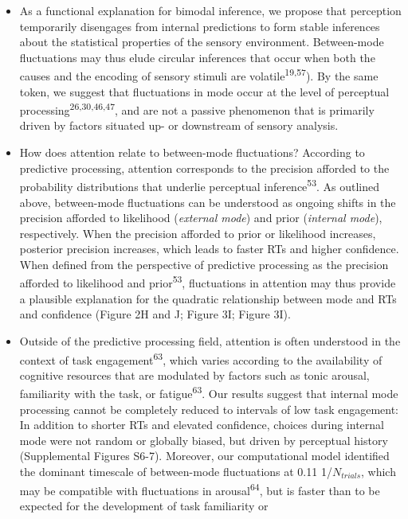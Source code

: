 \documentclass[
]{article}
\begin{document}
\begin{itemize}
\item
  As a functional explanation for bimodal inference, we propose that
  perception temporarily disengages from internal predictions to form
  stable inferences about the statistical properties of the sensory
  environment. Between-mode fluctuations may thus elude circular
  inferences that occur when both the causes and the encoding of sensory
  stimuli are volatile\textsuperscript{19,57}). By the same token, we
  suggest that fluctuations in mode occur at the level of perceptual
  processing\textsuperscript{26,30,46,47}, and are not a passive
  phenomenon that is primarily driven by factors situated up- or
  downstream of sensory analysis.
\item
  How does attention relate to between-mode fluctuations? According to
  predictive processing, attention corresponds to the precision afforded
  to the probability distributions that underlie perceptual
  inference\textsuperscript{53}. As outlined above, between-mode
  fluctuations can be understood as ongoing shifts in the precision
  afforded to likelihood (\emph{external mode}) and prior
  (\emph{internal mode}), respectively. When the precision afforded to
  prior or likelihood increases, posterior precision increases, which
  leads to faster RTs and higher confidence. When defined from the
  perspective of predictive processing as the precision afforded to
  likelihood and prior\textsuperscript{53}, fluctuations in attention
  may thus provide a plausible explanation for the quadratic
  relationship between mode and RTs and confidence (Figure 2H and J;
  Figure 3I; Figure 3I).
\item
  Outside of the predictive processing field, attention is often
  understood in the context of task engagement\textsuperscript{63},
  which varies according to the availability of cognitive resources that
  are modulated by factors such as tonic arousal, familiarity with the
  task, or fatigue\textsuperscript{63}. Our results suggest that
  internal mode processing cannot be completely reduced to intervals of
  low task engagement: In addition to shorter RTs and elevated
  confidence, choices during internal mode were not random or globally
  biased, but driven by perceptual history (Supplemental Figures S6-7).
  Moreover, our computational model identified the dominant timescale of
  between-mode fluctuations at 0.11 1/\(N_{trials}\), which may be
  compatible with fluctuations in arousal\textsuperscript{64}, but is
  faster than to be expected for the development of task familiarity or

\end{itemize}
\end{document}
